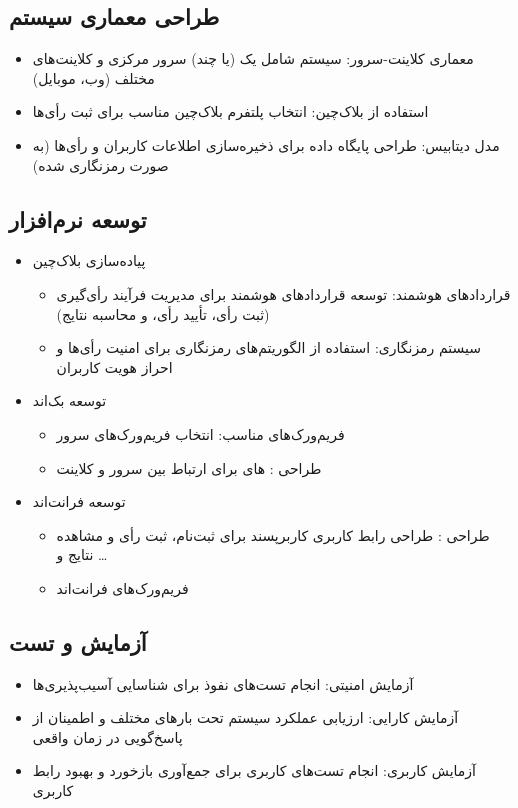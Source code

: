 \documentclass[12pt]{article}
\begin{document}
\subsection{طراحی معماری سیستم}
\begin{itemize}
\item
معماری کلاینت-سرور: سیستم شامل یک (یا چند) سرور مرکزی و کلاینت‌های مختلف (وب، موبایل)
\item
استفاده از بلاک‌چین: انتخاب پلتفرم بلاک‌چین مناسب برای ثبت رأی‌ها
\item
مدل دیتابیس: طراحی پایگاه داده برای ذخیره‌سازی اطلاعات کاربران و رأی‌ها (به صورت رمزنگاری شده)
\end{itemize}


\subsection{توسعه نرم‌افزار}
\begin{itemize}
\item
پیاده‌سازی بلاک‌چین
	\begin{itemize}
	\item
	قراردادهای هوشمند: توسعه قراردادهای هوشمند برای مدیریت فرآیند رأی‌گیری (ثبت رأی، تأیید رأی، و محاسبه نتایج)
	\item
	سیستم رمزنگاری: استفاده از الگوریتم‌های رمزنگاری برای امنیت رأی‌ها و احراز هویت کاربران
	\end{itemize}
\item
توسعه بک‌اند
	\begin{itemize}
	\item
	فریم‌ورک‌های مناسب: انتخاب فریم‌ورک‌های سرور
	\item
      طراحی 
      :
      های 
      برای ارتباط بین سرور و کلاینت
	\end{itemize}
\item
توسعه فرانت‌اند
	\begin{itemize}
	\item
	طراحی 
	: 
	طراحی رابط کاربری کاربرپسند برای ثبت‌نام، ثبت رأی و مشاهده نتایج و \ldots
	\item
	فریم‌ورک‌های فرانت‌اند
	\end{itemize}
\end{itemize}

\subsection{آزمایش و تست}
\begin{itemize}
\item
آزمایش امنیتی: انجام تست‌های نفوذ%
برای شناسایی آسیب‌پذیری‌ها
\item
آزمایش کارایی: ارزیابی عملکرد سیستم تحت بارهای مختلف و اطمینان از پاسخ‌گویی در زمان واقعی
\item
آزمایش کاربری: انجام تست‌های کاربری برای جمع‌آوری بازخورد و بهبود رابط کاربری
\end{itemize}
\end{document}
